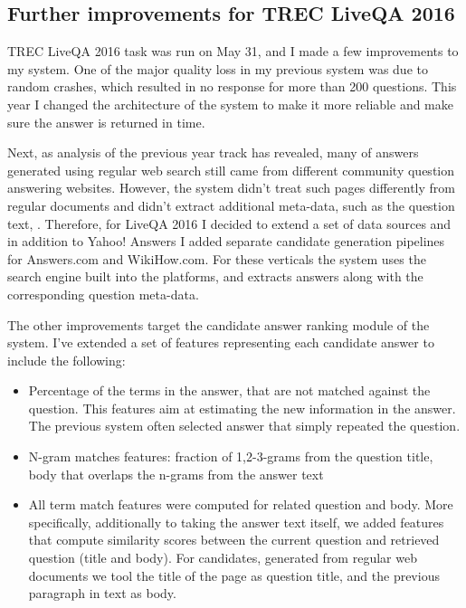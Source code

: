 \subsection{Further improvements for TREC LiveQA 2016}
\label{section:non-factoid:liveqa:improvements}

TREC LiveQA 2016 task was run on May 31, and I made a few improvements to my system.
One of the major quality loss in my previous system was due to random crashes, which resulted in no response for more than 200 questions.
This year I changed the architecture of the system to make it more reliable and make sure the answer is returned in time.

Next, as analysis of the previous year track has revealed, many of answers generated using regular web search still came from different community question answering websites.
However, the system didn't treat such pages differently from regular documents and didn't extract additional meta-data, such as the question text, \etc.
Therefore, for LiveQA 2016 I decided to extend a set of data sources and in addition to Yahoo! Answers I added separate candidate generation pipelines for Answers.com and WikiHow.com.
For these verticals the system uses the search engine built into the platforms, and extracts answers along with the corresponding question meta-data.

The other improvements target the candidate answer ranking module of the system.
I've extended a set of features representing each candidate answer to include the following:
\begin{itemize}
	\item Percentage of the terms in the answer, that are not matched against the question. This features aim at estimating the new information in the answer. The previous system often selected answer that simply repeated the question.
	\item N-gram matches features: fraction of 1,2-3-grams from the question title, body that overlaps the n-grams from the answer text
	\item All term match features were computed for related question and body. More specifically, additionally to taking the answer text itself, we added features that compute similarity scores between the current question and retrieved question (title and body). For candidates, generated from regular web documents we tool the title of the page as question title, and the previous paragraph in text as body.
\end{itemize}

